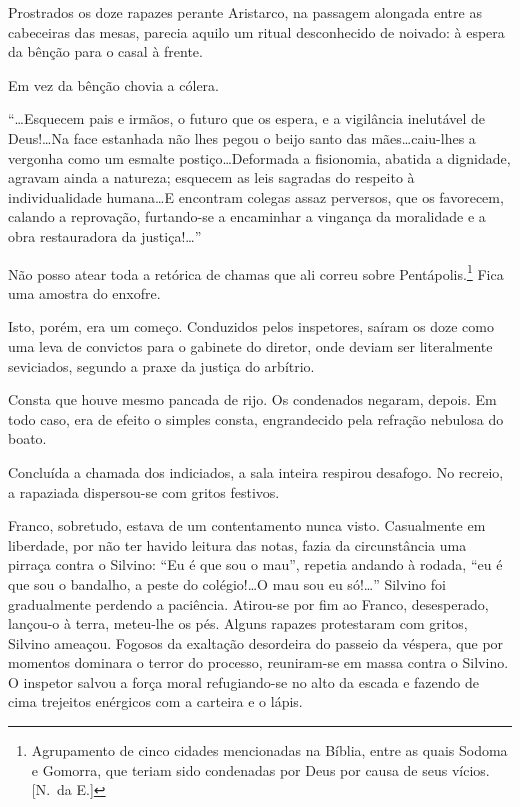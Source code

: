 Prostrados os doze rapazes perante Aristarco, na passagem alongada entre as
cabeceiras das mesas, parecia aquilo um ritual desconhecido de noivado:
à espera da bênção para o casal à frente. 

Em vez da bênção chovia a cólera. 

``\ldots Esquecem pais e irmãos, o futuro que os espera, e a
vigilância inelutável de Deus!\ldots Na face estanhada não lhes pegou o
beijo santo das mães\ldots caiu{}-lhes a vergonha como um esmalte
postiço\ldots Deformada a fisionomia, abatida a dignidade, agravam ainda a
natureza; esquecem as leis sagradas do respeito à individualidade
humana\ldots E encontram colegas assaz perversos, que os favorecem,
calando a reprovação, furtando{}-se a encaminhar a vingança da
moralidade e a obra restauradora da justiça!\ldots'' 

Não posso atear toda a retórica de chamas que ali correu 
sobre Pentápolis.\footnote{ Agrupamento de cinco cidades mencionadas na Bíblia, 
entre as quais Sodoma e Gomorra, que teriam sido condenadas por Deus 
por causa de seus vícios. [N.~da E.]} Fica uma amostra do enxofre. 

Isto, porém, era um começo. Conduzidos pelos inspetores,
saíram os doze como uma leva de convictos para o gabinete do diretor,
onde deviam ser literalmente seviciados, segundo a praxe da justiça do
arbítrio. 

Consta que houve mesmo pancada de rijo. Os condenados
negaram, depois. Em todo caso, era de efeito o simples consta,
engrandecido pela refração nebulosa do boato. 

Concluída a chamada dos indiciados, a sala inteira respirou 
desafogo. No recreio, a rapaziada dispersou{}-se com gritos festivos.

Franco, sobretudo, estava de um contentamento nunca visto. Casualmente
em liberdade, por não ter havido leitura das notas, fazia da
circunstância uma pirraça contra o Silvino: ``Eu é que sou o mau'',
repetia andando à rodada, ``eu é que sou o bandalho, a peste do
colégio!\ldots O mau sou eu só!\ldots'' Silvino foi gradualmente perdendo a
paciência. Atirou{}-se por fim ao Franco, desesperado, lançou{}-o à
terra, meteu{}-lhe os pés. Alguns rapazes protestaram com gritos,
Silvino ameaçou. Fogosos da exaltação desordeira do passeio da véspera,
que por momentos dominara o terror do processo, reuniram{}-se em massa
contra o Silvino. O inspetor salvou a força moral refugiando{}-se no
alto da escada e fazendo de cima trejeitos enérgicos com a carteira e o
lápis. 

